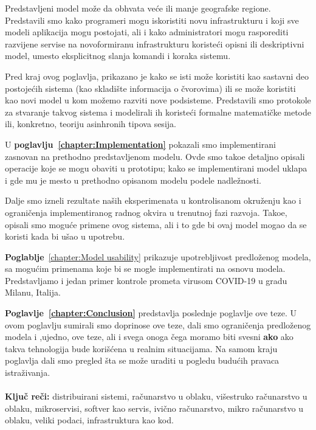 Predstavljeni model mo\v ze da obhvata ve\'ce ili manje geografske regione. Predstavili smo kako programeri mogu iskoristiti novu infrastrukturu i koji sve modeli aplikacija mogu postojati, ali i kako administratori mogu rasporediti razvijene servise na novoformiranu infrastrukturu koriste\'ci opisni ili deskriptivni model, umesto eksplicitnog slanja komandi i koraka sistemu.

Pred kraj ovog poglavlja, prikazano je kako se isti mo\v ze koristiti kao sastavni deo postoje\'cih sistema (kao skladi\v ste informacija o \v cvorovima) ili se mo\v ze koristiti kao novi model u kom mo\v zemo razviti nove podsisteme. Predstavili smo protokole za stvaranje takvog sistema i modelirali ih koriste\'ci formalne matemati\v cke metode ili, konkretno, teoriju asinhronih tipova sesija.

U \textbf{poglavlju~\ref{chapter:Implementation}} pokazali smo implementirani zasnovan na prethodno predstavljenom modelu. Ovde smo tako\dj e detaljno opisali operacije koje se mogu obaviti u prototipu; kako se implementirani model uklapa i gde mu je mesto u prethodno opisanom modelu podele nadle\v znosti.

Dalje smo izneli rezultate na\v sih eksperimenata u kontrolisanom okru\v zenju kao i ograni\v cenja implementiranog radnog okvira u trenutnoj fazi razvoja. Tako\dj e, opisali smo mogu\'ce primene ovog sistema, ali i to gde bi ovaj model mogao da se koristi kada bi u\v sao u upotrebu.

\textbf{Poglablje}~\ref{chapter:Model usability} prikazuje upotrebljivost predloženog modela, sa mogućim primenama koje bi se mogle implementirati na osnovu modela. Predstavljamo i jedan primer kontrole prometa virusom COVID-19 u gradu Milanu, Italija.

\textbf{Poglavlje~\ref{chapter:Conclusion}} predstavlja poslednje poglavlje ove teze. U ovom poglavlju sumirali smo doprinose ove teze, dali smo ograni\v cenja predlo\v zenog modela i ,ujedno, ove teze, ali i svega onoga \v cega moramo biti svesni \textbf{ako} ako takva tehnologija bude kori\v s\'cena u realnim situacijama. Na samom kraju poglavlja dali smo pregled \v sta se mo\v ze uraditi u pogledu budu\'cih pravaca istra\v zivanja.\\\\

\noindent
\textbf{Klju\v c re\v ci:} distribuirani sistemi, ra\v cunarstvo u oblaku, vi\v sestruko ra\v cunarstvo u oblaku, mikroservisi, softver kao servis, ivi\v cno ra\v cunarstvo, mikro ra\v cunarstvo u oblaku, veliki podaci, infrastruktura kao kod.